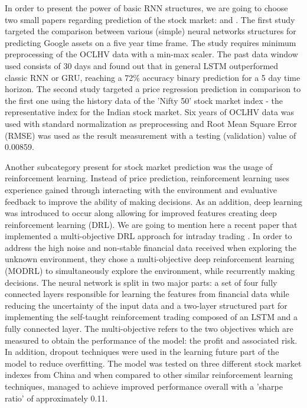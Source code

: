 In order to present the power of basic RNN structures, we are going to choose two small papers regarding prediction of the stock market: \cite{di2017recurrent} and \cite{roondiwala2017predicting}. The first study targeted the comparison between various (simple) neural networks structures for predicting Google assets on a five year time frame. The study requires minimum preprocessing of the OCLHV data with a min-max scaler. The past data window used consists of 30 days and found out that in general LSTM outperformed classic RNN or GRU, reaching a 72\% accuracy binary prediction for a 5 day time horizon. The second study targeted a price regression prediction in comparison to the first one using the history data of the 'Nifty 50' stock market index - the representative index for the Indian stock market. Six years of OCLHV data was used with standard normalization as preprocessing and Root Mean Square Error (RMSE) was used as the result measurement with a testing (validation) value of 0.00859.

Another subcategory present for stock market prediction was the usage of reinforcement learning. Instead of price prediction, reinforcement learning uses experience gained through interacting with the environment and evaluative feedback to improve the ability of making decisions. As an addition, deep learning was introduced to occur along allowing for improved features creating deep reinforcement learning (DRL). We are going to mention here a recent paper that implemented a multi-objective DRL approach for intraday trading \cite{si2017multi}. In order to address the high noise and non-stable financial data received when exploring the unknown environment, they chose a multi-objective deep reinforcement learning (MODRL) to simultaneously explore the environment, while recurrently making decisions. The neural network is split in two major parts: a set of four fully connected layers responsible for learning the features from financial data while reducing the uncertainty of the input data and a two-layer structured part for implementing the self-taught reinforcement trading composed of an LSTM and a fully connected layer. The multi-objective refers to the two objectives which are measured to obtain the performance of the model: the profit and associated risk. In addition, dropout techniques were used in the learning future part of the model to reduce overfitting. The model was tested on three different stock market indexes from China and when compared to other similar reinforcement learning techniques, managed to achieve improved performance overall with a 'sharpe ratio' of approximately 0.11.

